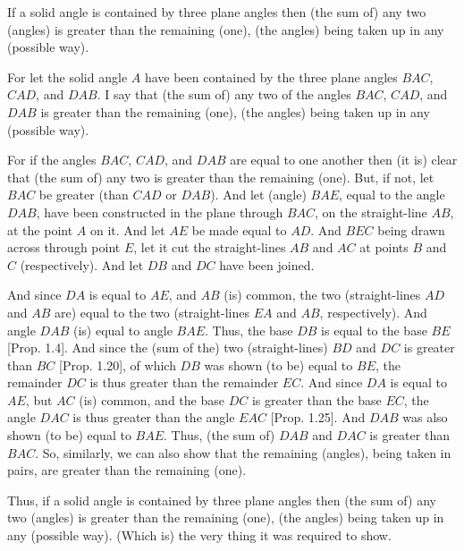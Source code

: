 \begin{Parallel}{}{}
{If a solid angle is contained by three plane angles
then (the sum of) any two (angles) is greater than the remaining (one), (the angles) being taken up in any (possible way).

\epsfysize=1.5in
\centerline{}

For let the solid angle $A$ have been contained by the three plane angles $BAC$, $CAD$, and $DAB$. I say that (the sum of) any two of the angles $BAC$, $CAD$, and $DAB$ is greater than the remaining (one),
(the angles) being taken up in any (possible way).

For if the angles $BAC$, $CAD$, and $DAB$ are equal to one another
then (it is) clear that (the sum of) any two is greater than
the remaining (one). But, if not, let $BAC$ be greater (than $CAD$ or $DAB$). And let (angle) $BAE$, equal to the angle $DAB$,  have been constructed in the plane through $BAC$, on the straight-line $AB$,
at the point $A$ on it. And let $AE$ be made equal to $AD$. And $BEC$
being drawn across through point $E$, let it cut the straight-lines $AB$
and $AC$ at points $B$ and $C$ (respectively). And let
$DB$ and $DC$ have been joined.

And since $DA$ is equal to $AE$, and $AB$ (is) common, the
two (straight-lines $AD$ and $AB$ are) equal to the two (straight-lines
$EA$ and $AB$, respectively). And angle $DAB$ (is) equal
to angle $BAE$. Thus, the base $DB$ is equal to the base $BE$ [Prop. 1.4]. And since the
(sum of the) two (straight-lines) $BD$ and $DC$ is greater than $BC$
[Prop. 1.20], of which $DB$ was shown
(to be) equal to $BE$, the  remainder $DC$ is thus greater than the
remainder $EC$. And since $DA$ is equal to $AE$, but
$AC$ (is) common, and the base $DC$ is  greater than the base
$EC$, the angle $DAC$ is thus greater than the angle $EAC$
[Prop. 1.25]. And $DAB$
was also shown (to be) equal to $BAE$. Thus, 
(the sum of) $DAB$ and $DAC$ is greater than $BAC$. So,
similarly, we can also show that the remaining  (angles), being taken in pairs, are greater than the remaining (one).

Thus,  if a solid angle is contained by three plane angles
then (the sum of) any two (angles) is greater than the remaining (one), (the angles) being taken up in any (possible way). (Which is) the very thing it
was required to show.}
\end{Parallel}

